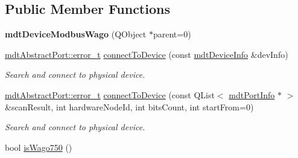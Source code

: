 \subsection*{Public Member Functions}
\begin{DoxyCompactItemize}
\item 
\hypertarget{classmdt_device_modbus_wago_a31abb03678a8afe2e6bf7c03e5e92726}{
{\bfseries mdtDeviceModbusWago} (QObject $\ast$parent=0)}
\label{classmdt_device_modbus_wago_a31abb03678a8afe2e6bf7c03e5e92726}

\item 
\hyperlink{classmdt_abstract_port_ad4121bb930c95887e77f8bafa065a85e}{mdtAbstractPort::error\_\-t} \hyperlink{classmdt_device_modbus_wago_a025f0411a708a529054a0e3c0b6461cd}{connectToDevice} (const \hyperlink{classmdt_device_info}{mdtDeviceInfo} \&devInfo)
\begin{DoxyCompactList}\small\item\em Search and connect to physical device. \end{DoxyCompactList}\item 
\hyperlink{classmdt_abstract_port_ad4121bb930c95887e77f8bafa065a85e}{mdtAbstractPort::error\_\-t} \hyperlink{classmdt_device_modbus_wago_a12ad1f1ef34b16be5903d1d6232a7c6d}{connectToDevice} (const QList$<$ \hyperlink{classmdt_port_info}{mdtPortInfo} $\ast$ $>$ \&scanResult, int hardwareNodeId, int bitsCount, int startFrom=0)
\begin{DoxyCompactList}\small\item\em Search and connect to physical device. \end{DoxyCompactList}\item 
\hypertarget{classmdt_device_modbus_wago_a6f01ba89d90ddfbcaa0cbda1885d22f1}{
bool \hyperlink{classmdt_device_modbus_wago_a6f01ba89d90ddfbcaa0cbda1885d22f1}{isWago750} ()}
\label{classmdt_device_modbus_wago_a6f01ba89d90ddfbcaa0cbda1885d22f1}


\end{DoxyCompactItemize}
